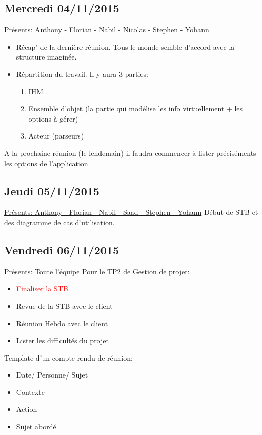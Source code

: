 \documentclass[a4paper,10pt]{article}
\begin{document}
\subsection{Mercredi 04/11/2015}
\underline{Présents: Anthony - Florian - Nabil - Nicolas - Stephen - Yohann} 
\\
\begin{itemize}
  \item Récap' de la dernière réunion. Tous le monde semble d'accord avec la structure imaginée.
  \item Répartition du travail. Il y aura 3 parties: \begin{enumerate}
                                                      \item IHM
                                                      \item Ensemble d'objet (la partie qui modélise les info virtuellement + les options à gérer)
                                                      \item Acteur (parseurs)
                                                     \end{enumerate}
\end{itemize}
A la prochaine réunion (le lendemain) il faudra commencer à lister préciséments les options de l'application.

\subsection{Jeudi 05/11/2015}
\underline{Présents: Anthony - Florian - Nabil - Saad - Stephen - Yohann} 
Début de STB et des diagramme de cas d'utilisation.

\subsection{Vendredi 06/11/2015}
\underline{Présents: Toute l'équipe} 
Pour le TP2 de Gestion de projet:\\
\begin{itemize}
 \item \textcolor{red}{\underline{Finaliser la STB}}
 \item Revue de la STB avec le client
 \item Réunion Hebdo avec le client
 \item Lister les difficultés du projet
\end{itemize}

Template d'un compte rendu de réunion:
\begin{itemize}
 \item Date/ Personne/ Sujet
 \item Contexte\\
 \item Action\\
 \item Sujet abordé
\end{itemize}
\end{document}
